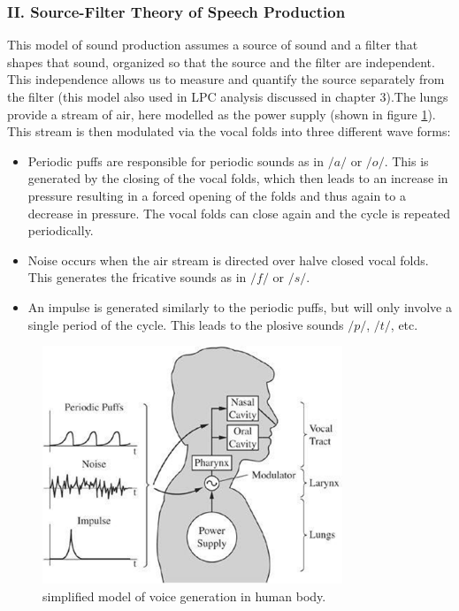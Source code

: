 \documentclass[12pt, a4paper, twoside]{report}
\begin{document}
\subsubsection{II. Source-Filter Theory of Speech Production}

This model of sound production assumes a source of sound and a filter that shapes that sound, organized so that the source and the filter are independent. This independence allows us to measure and quantify the source separately from the filter (this model also used in LPC analysis discussed in chapter 3).The lungs provide a stream of air, here modelled as the power supply (shown in figure \ref{fig:simple-model-voice-gen}). This stream is then modulated via the vocal folds into three different wave forms:
\begin{itemize}
\item Periodic puffs are responsible for periodic sounds as in $/a/$ or $/o/$. This is generated by the closing of the vocal folds, which then leads to an increase in pressure resulting in a forced opening of the folds and thus again to a decrease in pressure. The vocal folds can close again and the cycle is repeated periodically.
\item Noise occurs when the air stream is directed over halve closed vocal folds. This generates the fricative sounds as in $/f/$ or $/s/$.
\item An impulse is generated similarly to the periodic puffs, but will only involve a single period of the cycle. This leads to the plosive sounds $/p/$, $/t/$, etc.
\end{itemize}

\begin{figure}[ht]
	\centering
	\includegraphics[width=0.8\textwidth]
	{images/chapter2/simple-model-voice-gen}
	\caption{simplified model of voice generation in human body.}
	\label{fig:simple-model-voice-gen}
\end{figure}
\end{document}
